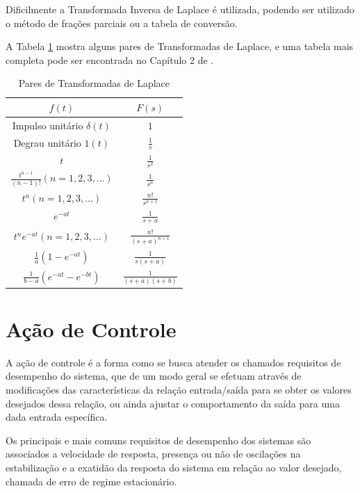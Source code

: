 Dificilmente a Transformada Inversa de Laplace é utilizada, podendo ser utilizado o método de frações parciais ou a tabela de conversão.

A Tabela \ref{tab:Laplace} mostra alguns pares de Transformadas de Laplace, e uma tabela mais completa pode ser encontrada no Capítulo 2 de \cite{Ogata}. 

\begin{table}[h]
\centering
\caption{Pares de Transformadas de Laplace}
\label{tab:Laplace}
\begin{tabular}{c|c}
\hline
$f(t)$ & $F(s)$ \\
\hline
\hline
Impulso unitário $\delta(t)$ 		& $1$ 			\\ \hline
Degrau unitário $1(t)$ 			& $\frac{1}{s}$		\\ \hline
$t$ 					& $\frac{1}{s^2}$ 	\\ \hline
$\frac{t^{n-1}}{(n-1)!} (n=1,2,3,...)$ 	& $\frac{1}{s^n}$ 	\\ \hline
$t^n (n=1,2,3,...)$ 			& $\frac{n!}{s^{n+1}}$ 	\\ \hline
$e^{-at}$ 				& $\frac{1}{s+a}$ 	\\ \hline
$t^n e^{-at} (n=1,2,3,...)$ 		& $\frac{n!}{(s+a)^{n+1}}$ \\\hline
$\frac{1}{a} (1-e^{-at})$ 		& $\frac{1}{s(s+a)}$ 	\\ \hline
$\frac{1}{b-a}(e^{-at}-e^{-bt})$ 	& $\frac{1}{(s+a)(s+b)}$ \\ \hline
\end{tabular}
\end{table}



\section{Ação de Controle}



A ação de controle é a forma como se busca atender os chamados requisitos de desempenho do sistema, que de um modo geral se efetuam através de modificações das características da relação entrada/saída para se obter os valores desejados dessa relação, ou ainda ajustar o comportamento da saída para uma dada entrada específica.


Os principais e mais comuns requisitos de desempenho dos sistemas são associados a velocidade de resposta, presença ou não de oscilações na estabilização e a exatidão da resposta do sistema em relação ao valor desejado, chamada de erro de regime estacionário.


